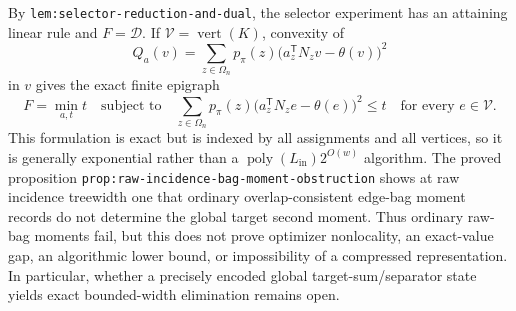 By \texttt{lem:selector-reduction-and-dual}, the selector experiment has an attaining linear rule and \(F=\mathcal D\).  If \(\mathcal V=\operatorname{vert}(K)\), convexity of
\[
Q_a(v)=\sum_{z\in\Omega_n}p_{\pi}(z)\bigl(a_z^{\mathsf T}N_zv-\theta(v)\bigr)^2
\]
in \(v\) gives the exact finite epigraph
\[
F=\min_{a,t}t
\quad\text{subject to}\quad
\sum_{z\in\Omega_n}p_{\pi}(z)
\bigl(a_z^{\mathsf T}N_ze-\theta(e)\bigr)^2\le t
\quad\text{for every }e\in\mathcal V.
\]
This formulation is exact but is indexed by all assignments and all vertices, so it is generally exponential rather than a \(\operatorname{poly}(L_{\mathrm{in}})2^{O(w)}\) algorithm.  The proved proposition \texttt{prop:raw-incidence-bag-moment-obstruction} shows at raw incidence treewidth one that ordinary overlap-consistent edge-bag moment records do not determine the global target second moment.  Thus ordinary raw-bag moments fail, but this does not prove optimizer nonlocality, an exact-value gap, an algorithmic lower bound, or impossibility of a compressed representation.  In particular, whether a precisely encoded global target-sum/separator state yields exact bounded-width elimination remains open.